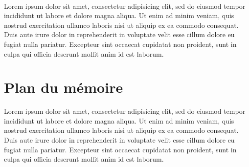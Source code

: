 \paragraph{}
Lorem ipsum dolor sit amet, consectetur adipisicing elit, sed do eiusmod
tempor incididunt ut labore et dolore magna aliqua. Ut enim ad minim veniam,
quis nostrud exercitation ullamco laboris nisi ut aliquip ex ea commodo
consequat. Duis aute irure dolor in reprehenderit in voluptate velit esse
cillum dolore eu fugiat nulla pariatur. Excepteur sint occaecat cupidatat non
proident, sunt in culpa qui officia deserunt mollit anim id est laborum.
\section*{Plan du mémoire}
\paragraph{}
Lorem ipsum dolor sit amet, consectetur adipisicing elit, sed do eiusmod
tempor incididunt ut labore et dolore magna aliqua. Ut enim ad minim veniam,
quis nostrud exercitation ullamco laboris nisi ut aliquip ex ea commodo
consequat. Duis aute irure dolor in reprehenderit in voluptate velit esse
cillum dolore eu fugiat nulla pariatur. Excepteur sint occaecat cupidatat non
proident, sunt in culpa qui officia deserunt mollit anim id est laborum.